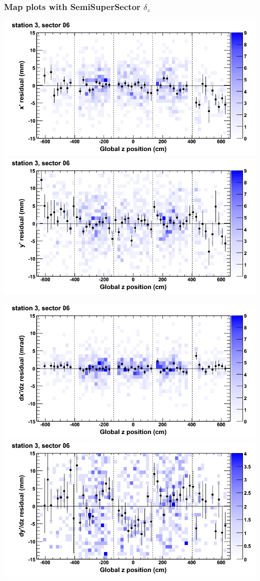 \documentclass[compress]{beamer}
\begin{document}
\begin{frame}
\frametitle{Map plots with SemiSuperSector $\delta_z$}
\includegraphics[width=0.5\linewidth]{zfit_mapplots/DTvsz_st3sec06_x.png}
\includegraphics[width=0.5\linewidth]{zfit_mapplots/DTvsz_st3sec06_y.png}

\includegraphics[width=0.5\linewidth]{zfit_mapplots/DTvsz_st3sec06_dxdz.png}
\includegraphics[width=0.5\linewidth]{zfit_mapplots/DTvsz_st3sec06_dydz.png}
\end{frame}
\end{document}
